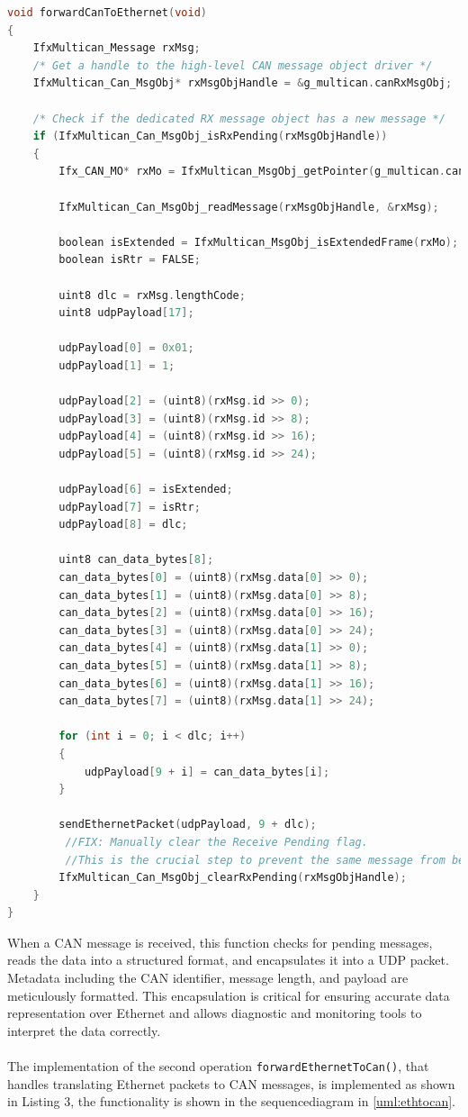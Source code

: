 \begin{lstlisting}[language=C, caption={CAN to Ethernet message translation (Gateway.c)}, label={lst:can_to_eth}]
void forwardCanToEthernet(void)
{
    IfxMultican_Message rxMsg;
    /* Get a handle to the high-level CAN message object driver */
    IfxMultican_Can_MsgObj* rxMsgObjHandle = &g_multican.canRxMsgObj;

    /* Check if the dedicated RX message object has a new message */
    if (IfxMultican_Can_MsgObj_isRxPending(rxMsgObjHandle))
    {
        Ifx_CAN_MO* rxMo = IfxMultican_MsgObj_getPointer(g_multican.can.mcan, rxMsgObjHandle->msgObjId);

        IfxMultican_Can_MsgObj_readMessage(rxMsgObjHandle, &rxMsg);

        boolean isExtended = IfxMultican_MsgObj_isExtendedFrame(rxMo);
        boolean isRtr = FALSE;

        uint8 dlc = rxMsg.lengthCode;
        uint8 udpPayload[17];

        udpPayload[0] = 0x01;
        udpPayload[1] = 1;

        udpPayload[2] = (uint8)(rxMsg.id >> 0);
        udpPayload[3] = (uint8)(rxMsg.id >> 8);
        udpPayload[4] = (uint8)(rxMsg.id >> 16);
        udpPayload[5] = (uint8)(rxMsg.id >> 24);

        udpPayload[6] = isExtended;
        udpPayload[7] = isRtr;
        udpPayload[8] = dlc;

        uint8 can_data_bytes[8];
        can_data_bytes[0] = (uint8)(rxMsg.data[0] >> 0);
        can_data_bytes[1] = (uint8)(rxMsg.data[0] >> 8);
        can_data_bytes[2] = (uint8)(rxMsg.data[0] >> 16);
        can_data_bytes[3] = (uint8)(rxMsg.data[0] >> 24);
        can_data_bytes[4] = (uint8)(rxMsg.data[1] >> 0);
        can_data_bytes[5] = (uint8)(rxMsg.data[1] >> 8);
        can_data_bytes[6] = (uint8)(rxMsg.data[1] >> 16);
        can_data_bytes[7] = (uint8)(rxMsg.data[1] >> 24);

        for (int i = 0; i < dlc; i++)
        {
            udpPayload[9 + i] = can_data_bytes[i];
        }

        sendEthernetPacket(udpPayload, 9 + dlc);
         //FIX: Manually clear the Receive Pending flag.
         //This is the crucial step to prevent the same message from being read again.         
        IfxMultican_Can_MsgObj_clearRxPending(rxMsgObjHandle);
    }
}
\end{lstlisting}
When a CAN message is received, this function checks for pending messages, reads the data into a structured format, and encapsulates it into a UDP packet. Metadata including the CAN identifier, message length, and payload are meticulously formatted. This encapsulation is critical for ensuring accurate data representation over Ethernet and allows diagnostic and monitoring tools to interpret the data correctly.\\\\
The implementation of the second operation \verb|forwardEthernetToCan()|, that handles translating Ethernet packets to CAN messages, is implemented as shown in Listing 3, the functionality is shown in the sequencediagram in \autoref{uml:ethtocan}.

